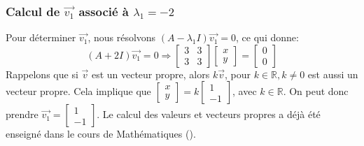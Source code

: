             \subsubsection{Calcul de $\overrightarrow{v_1}$ associé à $\lambda_1=-2$}
                Pour déterminer $\overrightarrow{v_1}$, nous résolvons $(A - \lambda_1 I) \overrightarrow{v_1}=0$, ce qui donne:
                \begin{equation}
                    (A + 2 I) \overrightarrow{v_1}=0 \Rightarrow
                    \begin{bmatrix} 3 & 3 \\ 3 & 3 \end{bmatrix} 
                    \begin{bmatrix} x \\ y \end{bmatrix}=
                    \begin{bmatrix} 0 \\ 0 \end{bmatrix}
                \end{equation}
                Rappelons que si $\overrightarrow{v}$ est un vecteur propre, alors $k\overrightarrow{v}$, pour $k \in \mathbb{R}, k\neq 0$ est aussi un vecteur propre. Cela implique que $\begin{bmatrix} x \\ y \end{bmatrix}=k \begin{bmatrix} 1 \\ -1 \end{bmatrix}$, avec $k \in \mathbb{R}$. On peut donc prendre $\overrightarrow{v_1}=\begin{bmatrix} 1 \\ -1 \end{bmatrix}$.
                Le calcul des valeurs et vecteurs propres a déjà été enseigné dans le cours de Mathématiques (\cite{mathf117}).
                
